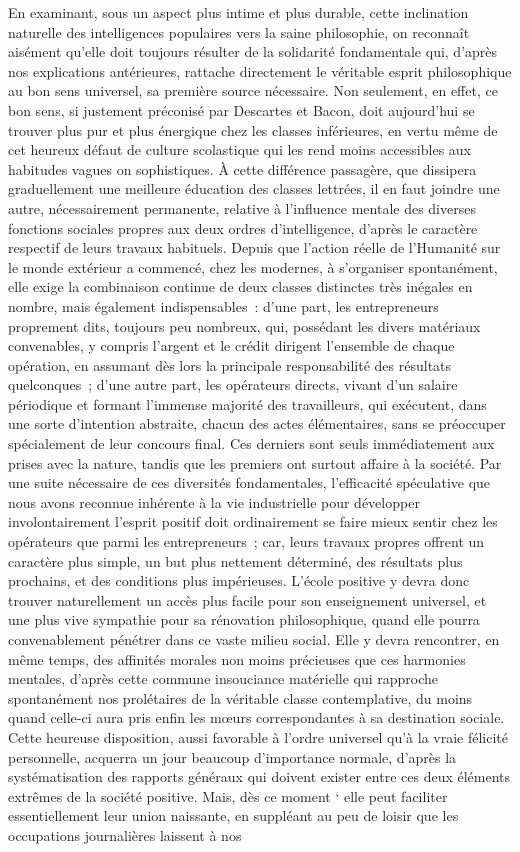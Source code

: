 \documentclass[french,twoside]{book} %
\begin{document}
En examinant, sous un aspect plus intime et plus durable, cette inclination naturelle des intelligences populaires vers la saine philosophie, on reconnaît aisément qu’elle doit toujours résulter de la solidarité fondamentale qui, d’après nos explications antérieures, rattache directement le véritable esprit philosophique au bon sens universel, sa première source nécessaire. Non seulement, en effet, ce bon sens, si justement préconisé par Descartes et Bacon, doit aujourd’hui se trouver plus pur et plus énergique chez les classes inférieures, en vertu même de cet heureux défaut de culture scolastique qui les rend moins accessibles aux habitudes vagues on sophistiques. À cette différence passagère, que dissipera graduellement une meilleure éducation des classes lettrées, il en faut joindre une autre, nécessairement permanente, relative à l’influence mentale des diverses fonctions sociales propres aux deux ordres d’intelligence, d’après le caractère respectif de leurs travaux habituels. Depuis que l’action réelle de l’Humanité sur le monde extérieur a commencé, chez les modernes, à s’organiser spontanément, elle exige la combinaison continue de deux classes distinctes très inégales en nombre, mais également indispensables : d’une part, les entrepreneurs proprement dits, toujours peu nombreux, qui, possédant les divers matériaux convenables, y compris l’argent et le crédit dirigent l’ensemble de chaque opération, en assumant dès lors la principale responsabilité des résultats quelconques ; d’une autre part, les opérateurs directs, vivant d’un salaire périodique et formant l’immense majorité des travailleurs, qui exécutent, dans une sorte d’intention abstraite, chacun des actes élémentaires, sans se préoccuper spécialement de leur concours final. Ces derniers sont seuls immédiatement aux prises avec la nature, tandis que les premiers ont surtout affaire à la société. Par une suite nécessaire de ces diversités fondamentales, l’efficacité spéculative que nous avons reconnue inhérente à la vie industrielle pour développer involontairement l’esprit positif doit ordinairement se faire mieux sentir chez les opérateurs que parmi les entrepreneurs ; car, leurs travaux propres offrent un caractère plus simple, un but plus nettement déterminé, des résultats plus prochains, et des conditions plus impérieuses. L’école positive y devra donc trouver naturellement un accès plus facile pour son enseignement universel, et une plus vive sympathie pour sa rénovation philosophique, quand elle pourra convenablement pénétrer dans ce vaste milieu social. Elle y devra rencontrer, en même temps, des affinités morales non moins précieuses que ces harmonies mentales, d’après cette commune insouciance matérielle qui rapproche spontanément nos prolétaires de la véritable classe contemplative, du moins quand celle-ci aura pris enfin les mœurs correspondantes à sa destination sociale. Cette heureuse disposition, aussi favorable à l’ordre universel qu’à la vraie félicité personnelle, acquerra un jour beaucoup d’importance normale, d’après la systématisation des rapports généraux qui doivent exister entre ces deux éléments extrêmes de la société positive. Mais, dès ce moment ‘ elle peut faciliter essentiellement leur union naissante, en suppléant au peu de loisir que les occupations journalières laissent à nos 
\end{document}
